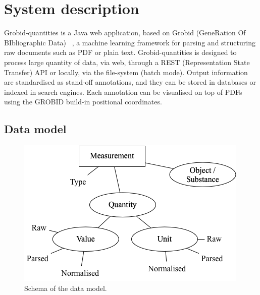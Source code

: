 \documentclass[sigconf]{acmart}
\begin{document}
\section{System description}
\label{sec:system}
Grobid-quantities is a Java web application, based on Grobid (GeneRation Of BIbliographic Data)~\cite{GROBID} \cite{lopez2009grobid}, a machine learning framework for parsing and structuring raw documents such as PDF or plain text. 
Grobid-quantities is designed to process large quantity of data, via web, through a REST (Representation State Transfer) API or locally, via the file-system (batch mode). 
Output information are standardised as stand-off annotations, and they can be stored in databases or indexed in search engines. Each annotation can be visualised on top of PDFs using the GROBID build-in positional coordinates.

\subsection{Data model}
\label{subsub:data-model}
\begin{figure}[ht]
  \centering
  \includegraphics[width=\linewidth]{images/schema-2}
  \caption{Schema of the data model.}
  \label{fig:data-model-schema-2}
\end{figure}
\end{document}
